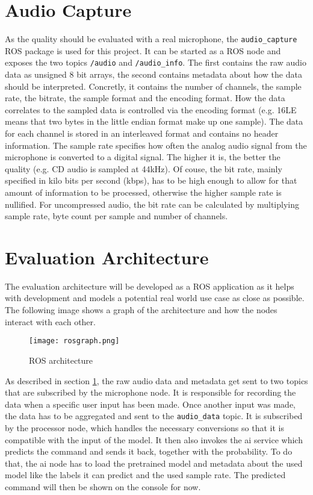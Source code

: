 \section{Audio Capture} \label{audio_capture}
As the quality should be evaluated with a real microphone, the \texttt{audio_capture} ROS package is used for this project. It can be started as a ROS node
and exposes the two topics \texttt{/audio} and \texttt{/audio_info}. The first contains the raw audio data as unsigned 8 bit arrays, the second contains metadata about
how the data should be interpreted. Concretly, it contains the number of channels, the sample rate, the bitrate, the sample format and the encoding format.
How the data correlates to the sampled data is controlled via the encoding format (e.g. 16LE means that two bytes in the little endian format make up one sample).
The data for each channel is stored in an interleaved format and contains no header information. The sample rate specifies how often the analog audio signal from
the microphone is converted to a digital signal. The higher it is, the better the quality (e.g. CD audio is sampled at 44kHz). Of couse, the bit rate, 
mainly specified in kilo bits per second (kbps), has to be high enough to allow for that amount of information to be processed, otherwise the higher sample rate is nullified. 
For uncompressed audio, the bit rate can be calculated by multiplying sample rate, byte count per sample and number of channels.

\section{Evaluation Architecture}
The evaluation architecture will be developed as a ROS application as it helps with development and models a potential real world use case as close as possible. 
The following image shows a graph of the architecture and how the nodes interact with each other.

\begin{figure}
  \texttt{[image: rosgraph.png]}
  \caption{ROS architecture}
  \label{fig:rosgraph}
\end{figure}

As described in section \ref{audio_capture}, the raw audio data and metadata get sent to two topics that are subscribed by the microphone node. It is responsible 
for recording the data when a specific user input has been made. Once another input was made, the data has to be aggregated and sent to the \texttt{audio_data} topic. It is 
subscribed by the processor node, which handles the necessary conversions so that it is compatible with the input of the model. It then also invokes the ai service
which predicts the command and sends it back, together with the probability. To do that, the ai node has to load the pretrained model and metadata about the
used model like the labels it can predict and the used sample rate. The predicted command will then be shown on the console for now.
